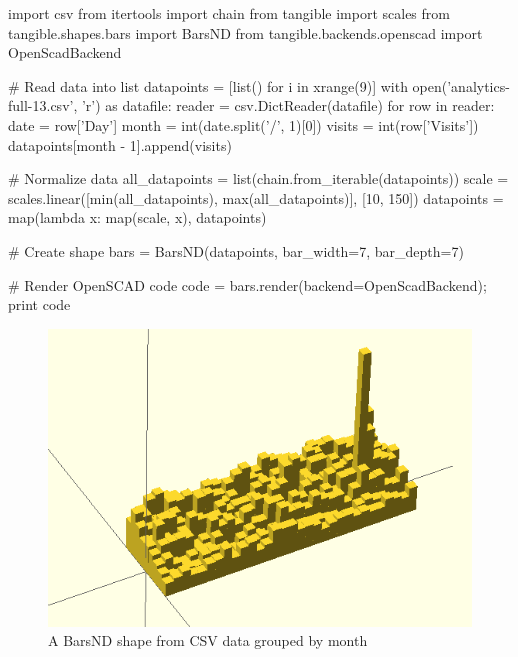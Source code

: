 \vspace{.5\baselineskip}
\begin{pythoncode}
import csv
from itertools import chain
from tangible import scales
from tangible.shapes.bars import BarsND
from tangible.backends.openscad import OpenScadBackend

# Read data into list
datapoints = [list() for i in xrange(9)]
with open('analytics-full-13.csv', 'r') as datafile:
    reader = csv.DictReader(datafile)
    for row in reader:
        date = row['Day']
        month = int(date.split('/', 1)[0])
        visits = int(row['Visits'])
        datapoints[month - 1].append(visits)

# Normalize data
all_datapoints = list(chain.from_iterable(datapoints))
scale = scales.linear([min(all_datapoints), max(all_datapoints)],
                      [10, 150])
datapoints = map(lambda x: map(scale, x), datapoints)

# Create shape
bars = BarsND(datapoints, bar_width=7, bar_depth=7)

# Render OpenSCAD code
code = bars.render(backend=OpenScadBackend); print code
\end{pythoncode}
\vspace{.5\baselineskip}

\begin{figure}[H]
	\centering
	\includegraphics[height=.28\textheight]{images/bars_nd.png}
	\caption{A BarsND shape from CSV data grouped by month}
	\label{img:bars_nd}
\end{figure}


